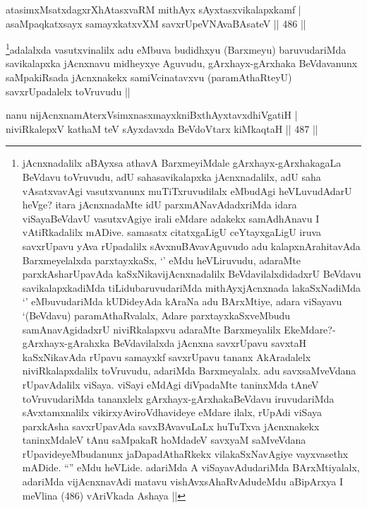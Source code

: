 \begin{shl}
atasimxMsatxdagxrXhAtasxvaRM mithAyx sAyxtasxvikalapxkamf | \\
asaMpaqkatxsayx samayxkatxvXM savxrUpeVNAvaBAsateV \hfill||  486 ||  
\end{shl}

\begin{artha}
\footnote{jAcnxnadalilx aBAyxsa athavA BarxmeyiMdale gArxhayx-gArxhakagaLa BeVdavu toVruvudu, adU sahasavikalapxka jAcnxnadalilx, adU saha vAsatxvavAgi vasutxvanunx muTiTxruvudilalx eMbudAgi heVLuvudAdarU heVge? itara jAcnxnadaMte idU parxmANavAdadxriMda idara viSayaBeVdavU vasutxvAgiye irali eMdare adakekx samAdhAnavu I vAtiRkadalilx mADive. samasatx citatxgaLigU ceYtayxgaLigU iruva savxrUpavu yAva rUpadalilx sAvxnuBAvavAguvudo adu kalapxnArahitavAda Barxmeyelalxda parxtayxkaSx, `\stext' eMdu heVLiruvudu, adaraMte parxkAsharUpavAda kaSxNikavijAcnxnadalilx BeVdavilalxdidadxrU BeVdavu savikalapxkadiMda tiLidubaruvudariMda mithAyxjAcnxnada lakaSxNadiMda `\stext' eMbuvudariMda kUDideyAda kAraNa adu BArxMtiye, adara viSayavu `(BeVdavu) paramAthaRvalalx, Adare parxtayxkaSxveMbudu samAnavAgidadxrU niviRkalapxvu adaraMte Barxmeyalilx EkeMdare?- gArxhayx-gArahxka BeVdavilalxda jAcnxna savxrUpavu savxtaH kaSxNikavAda rUpavu samayxkf savxrUpavu tananx AkAradalelx niviRkalapxdalilx toVruvudu, adariMda Barxmeyalalx. adu savxsaMveVdana rUpavAdalilx viSaya. viSayi eMdAgi diVpadaMte taninxMda tAneV toVruvudariMda tananxlelx gArxhayx-gArxhakaBeVdavu iruvudariMda sAvxtamxnalilx vikirxyAviroVdhavideye eMdare ilalx, rUpAdi viSaya parxkAsha savxrUpavAda savxBAvavuLaLx huTuTxva jAcnxnakekx taninxMdaleV tAnu saMpakaR hoMdadeV savxyaM saMveVdana rUpavideyeMbudanunx jaDapadAthaRkekx vilakaSxNavAgiye vayxvasethx mADide. ``\stext'' eMdu heVLide. adariMda A viSayavAdudariMda BArxMtiyalalx, adariMda vijAcnxnavAdi matavu vishAvxsAhaRvAdudeMdu aBipArxya I meVlina (486) vAriVkada Ashaya ||}adalalxda vasutxvinalilx adu eMbuva budidhxyu (Barxmeyu) baruvudariMda savikalapxka jAcnxnavu midheyxye Aguvudu, gArxhayx-gArxhaka BeVdavanunx saMpakiRsada jAcnxnakekx samiVcinatavxvu (paramAthaRteyU) savxrUpadalelx toVruvudu ||
\end{artha}


\begin{shl}
nanu nijAcnxnamAterxV\s simxnasxmayxkniBxthAyxtavxdhiVgatiH | \\
niviRkalepxV kathaM teV sAyxdavxda BeVdoV\s tarx kiMkaqtaH \hfill||  487 ||  
\end{shl}
				
